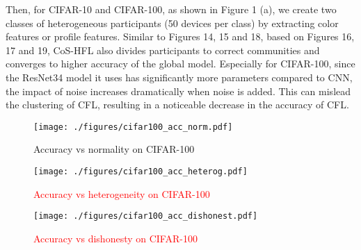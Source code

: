 \documentclass[a4paper,twoside,11pt,dvipsnames]{reviewresponse}
\begin{document}
Then, for CIFAR-10 and CIFAR-100, as shown in Figure 1 (a), we create two classes of heterogeneous participants (50 devices per class) by extracting color features or profile features. 
Similar to Figures 14, 15 and 18, based on Figures 16, 17 and 19, CoS-HFL also divides participants to correct communities and converges to higher accuracy of the global model. Especially for CIFAR-100, since the ResNet34 model it uses has significantly more parameters compared to CNN, the impact of noise increases dramatically when noise is added. This can mislead the clustering of CFL, resulting in a noticeable decrease in the accuracy of CFL.

\color{black}


\begin{figure}[tb]
	\captionsetup{font=tiny} %
	\begin{minipage}[!t]{0.333\linewidth}
		\centering
		\texttt{[image: ./figures/cifar100\_acc\_norm.pdf]}
		\vspace{-0.5em}
		\caption{{\color{red}Accuracy vs normality on CIFAR-100}}
		\label{result1:CIFAR100-normal-acc}
	\end{minipage}%
	\begin{minipage}[!t]{0.333\linewidth}
		\centering
		\texttt{[image: ./figures/cifar100\_acc\_heterog.pdf]}
		\vspace{-0.5em}
		\caption{\textcolor{red}{Accuracy vs heterogeneity on CIFAR-100}}
		\label{result1:CIFAR100-hetero-acc}
	\end{minipage}
	\begin{minipage}[!t]{0.333\linewidth}
		\centering
		\texttt{[image: ./figures/cifar100\_acc\_dishonest.pdf]}
		\vspace{-0.5em}
		\caption{\textcolor{red}{Accuracy vs dishonesty on CIFAR-100}}
		\label{result1:CIFAR100-dishonest-acc}
	\end{minipage}
	\vspace{-0.3cm}
\end{figure}
\end{document}
